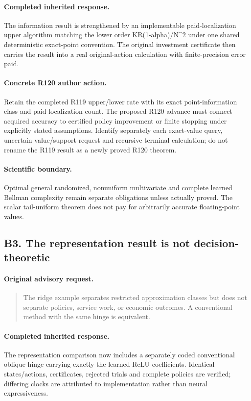\paragraph{Completed inherited response.}
The information result is strengthened by an implementable paid-localization upper algorithm matching the lower order KR(1-alpha)/N\textasciicircum{}2 under one shared deterministic exact-point convention. The original investment certificate then carries the result into a real original-action calculation with finite-precision error paid.
\paragraph{Concrete R120 author action.}
Retain the completed R119 upper/lower rate with its exact point-information class and paid localization count. The proposed R120 advance must connect acquired accuracy to certified policy improvement or finite stopping under explicitly stated assumptions. Identify separately each exact-value query, uncertain value/support request and recursive terminal calculation; do not rename the R119 result as a newly proved R120 theorem.
\paragraph{Scientific boundary.}
Optimal general randomized, nonuniform multivariate and complete learned Bellman complexity remain separate obligations unless actually proved. The scalar tail-uniform theorem does not pay for arbitrarily accurate floating-point values.

\subsection{B3. The representation result is not decision-theoretic}
\label{response120:B3}
\paragraph{Original advisory request.}
\begin{quote}
The ridge example separates restricted approximation classes but does not separate policies, service work, or economic outcomes. A conventional method with the same hinge is equivalent.
\end{quote}
\paragraph{Completed inherited response.}
The representation comparison now includes a separately coded conventional oblique hinge carrying exactly the learned ReLU coefficients. Identical states/actions, certificates, rejected trials and complete policies are verified; differing clocks are attributed to implementation rather than neural expressiveness.

